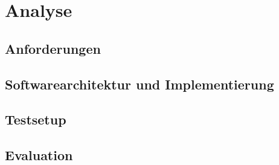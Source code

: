 \chapter{Analyse}
\section{Anforderungen}
\section{Softwarearchitektur und Implementierung}
\section{Testsetup}
\section{Evaluation}
